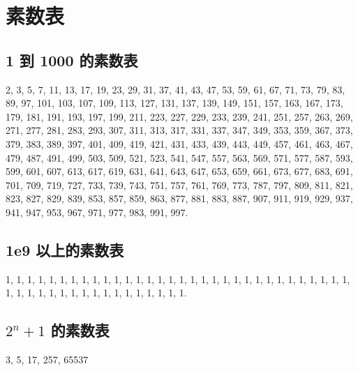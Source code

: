 \section{素数表}
\subsection{1 到 1000 的素数表}
2, 3, 5, 7, 11, 13, 17, 19, 23, 29, 31, 37, 41, 43, 47, 53, 59, 61, 67, 71, 73,
79, 83, 89, 97, 101, 103, 107, 109, 113, 127, 131, 137, 139, 149, 151, 157, 163,
167, 173, 179, 181, 191, 193, 197, 199, 211, 223, 227, 229, 233, 239, 241, 251,
257, 263, 269, 271, 277, 281, 283, 293, 307, 311, 313, 317, 331, 337, 347, 349,
353, 359, 367, 373, 379, 383, 389, 397, 401, 409, 419, 421, 431, 433, 439, 443,
449, 457, 461, 463, 467, 479, 487, 491, 499, 503, 509, 521, 523, 541, 547, 557,
563, 569, 571, 577, 587, 593, 599, 601, 607, 613, 617, 619, 631, 641, 643, 647,
653, 659, 661, 673, 677, 683, 691, 701, 709, 719, 727, 733, 739, 743, 751, 757,
761, 769, 773, 787, 797, 809, 811, 821, 823, 827, 829, 839, 853, 857, 859, 863,
877, 881, 883, 887, 907, 911, 919, 929, 937, 941, 947, 953, 967, 971, 977, 983,
991, 997.

\subsection{1e9 以上的素数表}
1, 1, 1, 1,
1, 1, 1, 1,
1, 1, 1, 1,
1, 1, 1, 1,
1, 1, 1, 1,
1, 1, 1, 1,
1, 1, 1, 1,
1, 1, 1, 1,
1, 1, 1, 1,
1, 1, 1, 1,
1, 1, 1, 1,
1, 1, 1, 1,
1.

\subsection{$2^n + 1$ 的素数表}
3, 5, 17, 257, 65537


